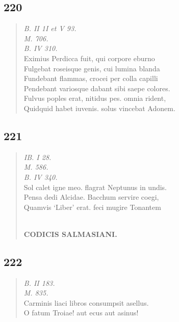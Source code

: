 \documentclass[11pt, a4paper]{report}
\begin{document}
            \subsection*{220}
      \begin{verse}
      \textit{B. II 1I et V 93.} \\ \textit{M. 706.} \\ \textit{B. IV 310.} \\ Eximius Perdicca fuit, qui corpore eburno \\ Fulgebat roseisque genis, cui lumina blanda \\ Fundebant flammas, crocei per colla capilli \\ Pendebant variosque dabant sibi saepe colores. \\ Fulvus poples erat, nitidus pes. omnia rident, \\ Quidquid habet iuvenis. solus vincebat Adonem. \\ 
      \end{verse}
  
            \subsection*{221}
      \begin{verse}
      \textit{IB. I 28.} \\ \textit{M. 586.} \\ \textit{B. IV 340.} \\ Sol calet igne meo. flagrat Neptunus in undis. \\ Pensa dedi Alcidae. Bacchum servire coegi, \\ Quamvis ‘Liber’ erat. feci mugire Tonantem \\ 
        ﻿\pagebreak 
    \begin{center} \textbf{CODICIS SALMASIANI.} \end{center} \marginpar{[187]} 
      \end{verse}
  
            \subsection*{222}
      \begin{verse}
      \textit{B. II 183.} \\ \textit{M. 835.} \\ Carminis liaci libros consumpsit asellus. \\ O fatum Troiae! aut ecus aut asinus! \\ 
      \end{verse}
  
\end{document}
